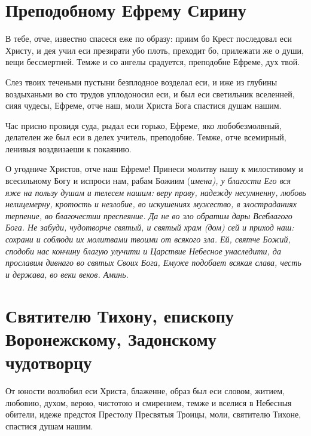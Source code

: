 \section{Преподобному Ефрему Сирину}
 




В тебе, отче, известно спасеся еже по образу: приим бо Крест последовал еси Христу, и дея учил еси презирати убо плоть, преходит бо, прилежати же о души, вещи бессмертней. Темже и со ангелы срадуется, преподобне Ефреме, дух твой.




Слез твоих теченьми пустыни безплодное возделал еси, и иже из глубины воздыханьми во сто трудов уплодоносил еси, и был еси светильник вселенней, сияя чудесы, Ефреме, отче наш, моли Христа Бога спастися душам нашим.




Час присно провидя суда, рыдал еси горько, Ефреме, яко любобезмолвный, делателен же был еси в делех учитель, преподобне. Темже, отче всемирный, ленивыя воздвизаеши к покаянию.




О угодниче Христов, отче наш Ефреме! Принеси молитву нашу к милостивому и всесильному Богу и испроси нам, рабам Божиим (\itshape имена\normalfont{}), у благости Его вся яже на пользу душам и телесем нашим: веру праву, надежду несумненну, любовь нелицемерну, кротость и незлобие, во искушениях мужество, в злостраданиях терпение, во благочестии преспеяние. Да не во зло обратим дары Всеблагого Бога. Не забуди, чудотворче святый, и святый храм (дом) сей и приход наш: сохрани и соблюди их молитвами твоими от всякого зла. Ей, святче Божий, сподоби нас кончину благую улучити и Царствие Небесное унаследити, да прославим дивнаго во святых Своих Бога, Емуже подобает всякая слава, честь и держава, во веки веков. Аминь.


\section{Святителю Тихону, епископу Воронежскому, Задонскому чудотворцу}
 




От юности возлюбил еси Христа, блаженне, образ был еси словом, житием, любовию, духом, верою, чистотою и смирением, темже и вселися в Небесныя обители, идеже предстоя Престолу Пресвятыя Троицы, моли, святителю Тихоне, спастися душам нашим.


